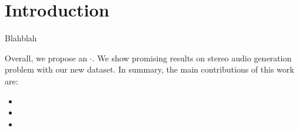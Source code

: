 \section{Introduction}
\label{sec:intro}
Blahblah

Overall, we propose an $\cdot$. We show promising results on stereo audio generation problem with our new dataset. In summary, the main contributions of this work are:
\begin{itemize}
    \item 
    \item 
    \item 
\end{itemize}